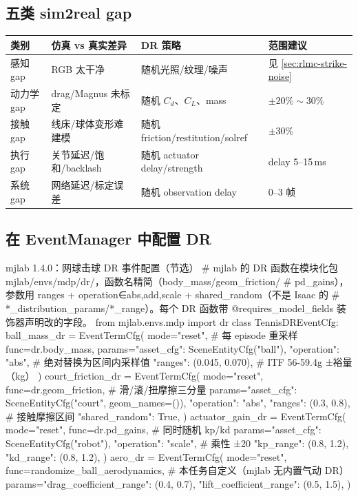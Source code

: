 \subsection{五类 sim2real gap}

\begin{center}
\small
\begin{tabular}{@{}llll@{}}
\toprule
类别 & 仿真 vs 真实差异 & DR 策略 & 范围建议 \\
\midrule
感知 gap & RGB 太干净 & 随机光照/纹理/噪声 & 见 \cref{sec:rlmc-strike-noise} \\
动力学 gap & drag/Magnus 未标定 & 随机 $C_d$、$C_L$、mass & $\pm 20\%\sim30\%$ \\
接触 gap & 线床/球体变形难建模 & 随机 friction/restitution/solref & $\pm 30\%$ \\
执行 gap & 关节延迟/饱和/backlash & 随机 actuator delay/strength & delay 5--15\,ms \\
系统 gap & 网络延迟/标定误差 & 随机 observation delay & 0--3 帧 \\
\bottomrule
\end{tabular}
\end{center}

\subsection{在 EventManager 中配置 DR}

\begin{codebox}[Python]{mjlab 1.4.0：网球击球 DR 事件配置（节选）}
# mjlab 的 DR 函数在模块化包 mjlab/envs/mdp/dr/，函数名精简（body_mass/geom_friction/
# pd_gains），参数用 ranges + operation∈{abs,add,scale} + shared_random（不是 Isaac 的
# *_distribution_params/*_range）。每个 DR 函数带 @requires_model_fields 装饰器声明改的字段。
from mjlab.envs.mdp import dr
class TennisDREventCfg:
    ball_mass_dr = EventTermCfg(
        mode="reset",                                # 每 episode 重采样
        func=dr.body_mass,
        params={"asset_cfg": SceneEntityCfg("ball"),
                "operation": "abs",                  # 绝对替换为区间内采样值
                "ranges": (0.045, 0.070)},           # ITF 56-59.4g ±裕量（kg）
    )
    court_friction_dr = EventTermCfg(
        mode="reset",
        func=dr.geom_friction,                       # 滑/滚/扭摩擦三分量
        params={"asset_cfg": SceneEntityCfg("court", geom_names=()),
                "operation": "abs",
                "ranges": (0.3, 0.8),                # 接触摩擦区间
                "shared_random": True},
    )
    actuator_gain_dr = EventTermCfg(
        mode="reset",
        func=dr.pd_gains,                            # 同时随机 kp/kd
        params={"asset_cfg": SceneEntityCfg("robot"),
                "operation": "scale",                # 乘性 ±20%
                "kp_range": (0.8, 1.2),
                "kd_range": (0.8, 1.2)},
    )
    aero_dr = EventTermCfg(
        mode="reset",
        func=randomize_ball_aerodynamics,            # 本任务自定义（mjlab 无内置气动 DR）
        params={"drag_coefficient_range": (0.4, 0.7),
                "lift_coefficient_range": (0.5, 1.5)},
    )
\end{codebox}

